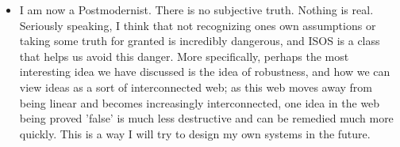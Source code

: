 \documentclass[letterpaper]{article}
\begin{document}
\begin{itemize}
\begin{itemize}
\item I am now a Postmodernist. There is no subjective truth. Nothing is
real. Seriously speaking, I think that not recognizing ones own
assumptions or taking some truth for granted is incredibly
dangerous, and ISOS is a class that helps us avoid this danger. More
specifically, perhaps the most interesting idea we have discussed is
the idea of robustness, and how we can view ideas as a sort of
interconnected web; as this web moves away from being linear and
becomes increasingly interconnected, one idea in the web being
proved 'false' is much less destructive and can be remedied much
more quickly. This is a way I will try to design my own systems in
the future.
\end{itemize}
\end{itemize}
\end{document}
